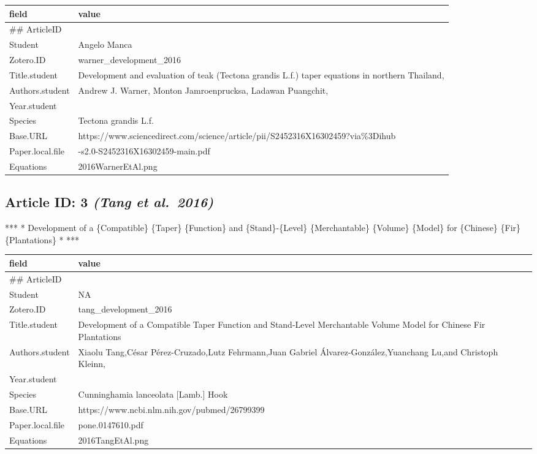 \documentclass[]{article}
\begin{document}
\begin{table}[H]
\centering
\begin{tabular}{>{\raggedright\arraybackslash}p{2cm}>{\raggedright\arraybackslash}p{8cm}}
\toprule
field & value\\
\midrule
\#\# ArticleID & 2\\
Student & Angelo Manca\\
Zotero.ID & warner\_development\_2016\\
Title.student & Development and evaluation of teak (Tectona grandis L.f.) taper equations in northern Thailand,\\
Authors.student & Andrew J. Warner, Monton Jamroenprucksa, Ladawan Puangchit,\\
\addlinespace
Year.student & 2016\\
Species & Tectona grandis L.f.\\
Base.URL & https://www.sciencedirect.com/science/article/pii/S2452316X16302459?via\%3Dihub\\
Paper.local.file & 1-s2.0-S2452316X16302459-main.pdf\\
Equations & 2016WarnerEtAl.png\\
\bottomrule
\end{tabular}
\end{table}

\hypertarget{article-id-3-tang-et-al.2016}{%
\subsection{\texorpdfstring{Article ID: 3 \textbf{\emph{(Tang et
al.~2016)}}}{Article ID: 3 (Tang et al.~2016)}}\label{article-id-3-tang-et-al.2016}}

*** * Development of a \{Compatible\} \{Taper\} \{Function\} and
\{Stand\}-\{Level\} \{Merchantable\} \{Volume\} \{Model\} for
\{Chinese\} \{Fir\} \{Plantations\} * ***

\begin{table}[H]
\centering
\begin{tabular}{>{\raggedright\arraybackslash}p{2cm}>{\raggedright\arraybackslash}p{8cm}}
\toprule
field & value\\
\midrule
\#\# ArticleID & 3\\
Student & NA\\
Zotero.ID & tang\_development\_2016\\
Title.student & Development of a Compatible Taper Function and Stand-Level Merchantable Volume Model for Chinese Fir Plantations\\
Authors.student & Xiaolu Tang,César Pérez-Cruzado,Lutz Fehrmann,Juan Gabriel Álvarez-González,Yuanchang Lu,and Christoph Kleinn,\\
\addlinespace
Year.student & 2016\\
Species & Cunninghamia lanceolata [Lamb.] Hook\\
Base.URL & https://www.ncbi.nlm.nih.gov/pubmed/26799399\\
Paper.local.file & pone.0147610.pdf\\
Equations & 2016TangEtAl.png\\
\bottomrule
\end{tabular}
\end{table}
\end{document}

